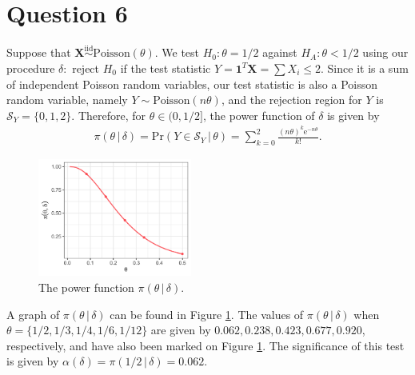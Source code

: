 \documentclass[10pt]{article}
\begin{document}
\section{Question 6} \noindent
Suppose that \(\bm{X} \overset{\mathrm{iid}}{\sim} \mathrm{Poisson}( \theta)\). We test \(H_0 : \theta = 1/2\) against \(H_A : \theta < 1/2\) using 
our procedure \(\delta :\) reject \(H_0\) if the test statistic \(Y = \mathbf{1}^T \bm{X} = \sum X_i \le 2\). Since it is a sum of independent Poisson random 
variables, our test statistic is also a Poisson random variable, namely \(Y \sim \mathrm{Poisson}(n \theta)\), and the rejection region for \(Y\) is 
\(\mathcal{S}_Y = \{0,1,2\}\). Therefore, for \(\theta \in (0,1/2]\), the power function of \(\delta\) is given by 
\begin{align*}
    \pi(\theta \,|\, \delta)
    = \mathrm{Pr}(Y \in \mathcal{S}_Y \,|\, \theta)
    = \sum_{k=0}^2 \frac{(n\theta)^k \mathrm{e}^{-n\theta}}{k!}.
\end{align*}
\begin{figure}
    \centering
    \includegraphics[width = 0.45\textwidth]{img/q06-power-function.png}
    \caption{The power function \(\pi(\theta \,|\, \delta)\).}
    \label{q06-power-function}
\end{figure}
A graph of \(\pi(\theta\,|\,\delta)\) can be found in Figure \ref{q06-power-function}.
The values of \(\pi(\theta\,|\,\delta)\) when \(\theta = \{1/2,1/3,1/4,1/6,1/12\}\) are given by 
\(0.062, 0.238, 0.423, 0.677, 0.920\), respectively, and have also been marked on Figure \ref{q06-power-function}.
The significance of this test is given by \(\alpha(\delta) = \pi(1/2 \,|\, \delta) = 0.062\).
\end{document}

